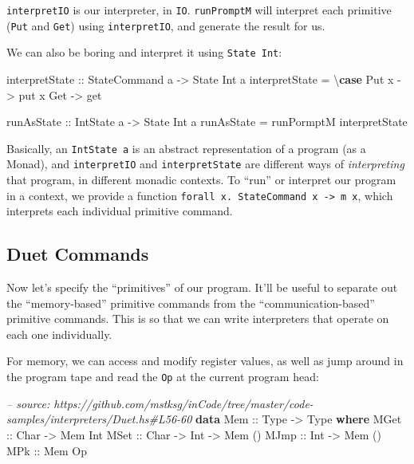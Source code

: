 \documentclass[]{article}
\newenvironment{Shaded}{}{}
\newcommand{\KeywordTok}[1]{\textcolor[rgb]{0.00,0.44,0.13}{\textbf{#1}}}
\newcommand{\DataTypeTok}[1]{\textcolor[rgb]{0.56,0.13,0.00}{#1}}
\newcommand{\CommentTok}[1]{\textcolor[rgb]{0.38,0.63,0.69}{\textit{#1}}}
\newcommand{\OtherTok}[1]{\textcolor[rgb]{0.00,0.44,0.13}{#1}}
\newcommand{\FunctionTok}[1]{\textcolor[rgb]{0.02,0.16,0.49}{#1}}
\newcommand{\NormalTok}[1]{#1}
\begin{document}
\texttt{interpretIO} is our interpreter, in \texttt{IO}. \texttt{runPromptM}
will interpret each primitive (\texttt{Put} and \texttt{Get}) using
\texttt{interpretIO}, and generate the result for us.

We can also be boring and interpret it using \texttt{State\ Int}:

\begin{Shaded}
\begin{Highlighting}[]
\OtherTok{interpretState ::} \DataTypeTok{StateCommand}\NormalTok{ a }\OtherTok{->} \DataTypeTok{State} \DataTypeTok{Int}\NormalTok{ a}
\NormalTok{interpretState }\FunctionTok{=}\NormalTok{ \textbackslash{}}\KeywordTok{case}
    \DataTypeTok{Put}\NormalTok{ x }\OtherTok{->}\NormalTok{ put x}
    \DataTypeTok{Get}   \OtherTok{->}\NormalTok{ get}

\OtherTok{runAsState ::} \DataTypeTok{IntState}\NormalTok{ a }\OtherTok{->} \DataTypeTok{State} \DataTypeTok{Int}\NormalTok{ a}
\NormalTok{runAsState }\FunctionTok{=}\NormalTok{ runPormptM interpretState}
\end{Highlighting}
\end{Shaded}

Basically, an \texttt{IntState\ a} is an abstract representation of a program
(as a Monad), and \texttt{interpretIO} and \texttt{interpretState} are different
ways of \emph{interpreting} that program, in different monadic contexts. To
``run'' or interpret our program in a context, we provide a function
\texttt{forall\ x.\ StateCommand\ x\ -\textgreater{}\ m\ x}, which interprets
each individual primitive command.

\subsection{Duet Commands}\label{duet-commands}

Now let's specify the ``primitives'' of our program. It'll be useful to separate
out the ``memory-based'' primitive commands from the ``communication-based''
primitive commands. This is so that we can write interpreters that operate on
each one individually.

For memory, we can access and modify register values, as well as jump around in
the program tape and read the \texttt{Op} at the current program head:

\begin{Shaded}
\begin{Highlighting}[]
\CommentTok{-- source: https://github.com/mstksg/inCode/tree/master/code-samples/interpreters/Duet.hs#L56-60}
\KeywordTok{data} \DataTypeTok{Mem}\OtherTok{ ::} \DataTypeTok{Type} \OtherTok{->} \DataTypeTok{Type} \KeywordTok{where}
    \DataTypeTok{MGet}\OtherTok{ ::} \DataTypeTok{Char} \OtherTok{->} \DataTypeTok{Mem} \DataTypeTok{Int}
    \DataTypeTok{MSet}\OtherTok{ ::} \DataTypeTok{Char} \OtherTok{->} \DataTypeTok{Int} \OtherTok{->} \DataTypeTok{Mem}\NormalTok{ ()}
    \DataTypeTok{MJmp}\OtherTok{ ::} \DataTypeTok{Int} \OtherTok{->} \DataTypeTok{Mem}\NormalTok{ ()}
    \DataTypeTok{MPk}\OtherTok{  ::} \DataTypeTok{Mem} \DataTypeTok{Op}
\end{Highlighting}
\end{Shaded}
\end{document}
